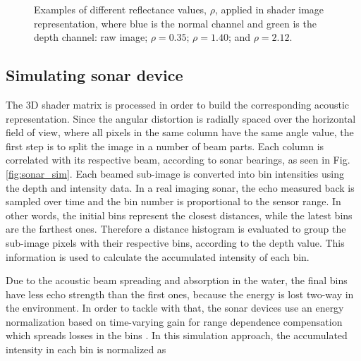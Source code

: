 \documentclass[final,5p,times]{elsarticle}
\begin{document}
\begin{figure}[h]
{        \label{fig:reflectance:2.12}
    }
    \captionsetup{justification=centering}
    \caption{Examples of different reflectance values, $\rho$, applied in shader image representation, where blue is the normal channel and green is the depth channel:  raw image;  $\rho = 0.35$;  $\rho = 1.40$; and  $\rho = 2.12$.}
    \label{fig:sonar_reflectances}
\end{figure}



\subsection{Simulating sonar device}
\label{dev:sonardata}

The 3D shader matrix is processed in order to build the corresponding acoustic representation. Since the angular distortion is radially spaced over the horizontal field of view, where all pixels in the same column have the same angle value, the first step is to split the image in a number of beam parts. Each column is correlated with its respective beam, according to sonar bearings, as seen in Fig. \ref{fig:sonar_sim}. Each beamed sub-image is converted into bin intensities using the depth and intensity data. In a real imaging sonar, the echo measured back is sampled over time and the bin number is proportional to the sensor range. In other words, the initial bins represent the closest distances, while the latest bins are the farthest ones. Therefore a distance histogram is evaluated to group the sub-image pixels with their respective bins, according to the depth value. This information is used to calculate the accumulated intensity of each bin.

Due to the acoustic beam spreading and absorption in the water, the final bins have less echo strength than the first ones, because the energy is lost two-way in the environment. In order to tackle with that, the sonar devices use an energy normalization based on time-varying gain for range dependence compensation which spreads losses in the bins \cite{urick2013}. In this simulation approach, the accumulated intensity in each bin is normalized as
\end{document}
